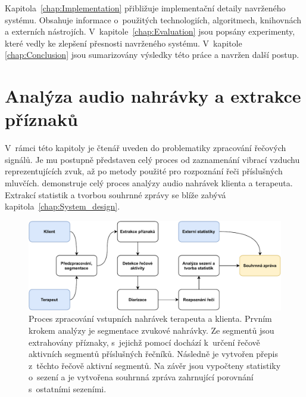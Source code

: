 Kapitola~\ref{chap:Implementation} přibližuje implementační detaily navrženého systému. Obsahuje informace o~použitých technologiích, algoritmech, knihovnách a externích nástrojích. V~kapitole~\ref{chap:Evaluation} jsou popsány experimenty, které vedly ke zlepšení přesnosti navrženého systému.
V~kapitole \ref{chap:Conclusion} jsou sumarizovány výsledky této práce a navržen další postup.



\chapter{Analýza audio nahrávky a extrakce příznaků}
\label{chap:FeatureExctraction}
V~rámci této kapitoly je čtenář uveden do problematiky zpracování řečových signálů. Je mu postupně představen celý proces od zaznamenání vibrací vzduchu reprezentujících zvuk, až po metody použité pro rozpoznání řeči příslušných mluvčích.  demonstruje celý proces analýzy audio nahrávek klienta a terapeuta. Extrakcí statistik a tvorbou souhrnné zprávy se blíže zabývá kapitola~\ref{chap:System_design}.

\begin{figure}[ht]
  \centering
  \includegraphics[width=\linewidth]{obrazky-figures/schema.pdf}
  \caption{Proces zpracování vstupních nahrávek terapeuta a klienta. Prvním krokem analýzy je segmentace zvukové nahrávky. Ze segmentů jsou extrahovány příznaky, s~jejichž pomocí dochází k~určení řečově aktivních segmentů příslušných řečníků. Následně je vytvořen přepis z~těchto řečově aktivní segmentů. Na závěr jsou vypočteny statistiky o~sezení a je vytvořena souhrnná zpráva zahrnující porovnání s~ostatními sezeními.}
  \label{fig:ProcessingSchema}
\end{figure}



